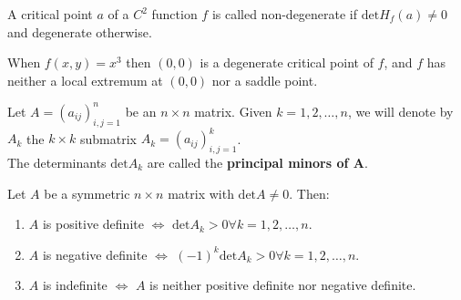 \begin{definition}
    A critical point $a$ of a $C^2$ function $f$ is called non-degenerate if $\mathrm{det} H_f(a) \neq 0$ and degenerate otherwise.
\end{definition}

\begin{example}
    When $f(x,y) = x^3$ then $(0,0)$ is a degenerate critical point of $f$, and $f$ has neither a local extremum at $(0,0)$ nor a saddle point.
\end{example}

\begin{definition}
    Let $A = (a_{ij})^n_{i,j=1}$ be an $n \times n$ matrix. Given $k = 1, 2, \dots, n$, we will denote by $A_k$ the $k \times k$ submatrix $A_k = (a_{ij})^k_{i,j=1}$. \\
    The determinants $\mathrm{det} A_k$ are called the \textbf{principal minors of A}.
\end{definition}

\begin{proposition}
    Let $A$ be a symmetric $n \times n$ matrix with $\mathrm{det}A \neq 0$. Then:
    \begin{enumerate}
        \item $A$ is positive definite $\iff$ $\mathrm{det} A_k > 0 \forall k = 1, 2, \dots, n$.
        \item $A$ is negative definite $\iff$ $(-1)^k \mathrm{det} A_k > 0 \forall k = 1, 2, \dots, n$.
        \item $A$ is indefinite $\iff$ $A$ is neither positive definite nor negative definite.
    \end{enumerate}
\end{proposition}